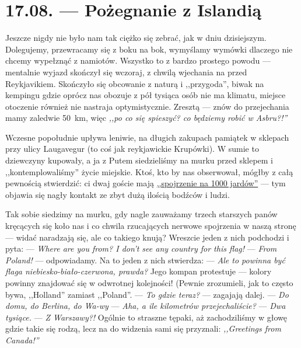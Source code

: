 \chapter*{17.08. --- Pożegnanie z Islandią}

Jeszcze nigdy nie było nam tak ciężko się zebrać, jak w dniu dzisiejszym. Dolegujemy, przewracamy się z boku na bok, wymyślamy wymów\-ki dlaczego nie chcemy wypełznąć z namiotów. Wszystko to z bardzo prostego powodu --- mentalnie wyjazd skończył się wczoraj, z chwilą wjechania na  przed Reykjavikiem. Skończyło się obcowanie z naturą i ,,przygoda'', biwak na kempingu gdzie oprócz nas obozuje z pół tysiąca osób nie ma klimatu, miejsce otoczenie również nie nastraja optymistycznie. Zresztą --- znów do przejechania mamy zaledwie 50~km, więc \emph{,,po co się spieszyć? co będziemy robić w Asbru?!''}

Wczesne popołudnie upływa leniwie, na długich zakupach pamiątek w sklepach przy ulicy Laugavegur (to coś jak reykjawickie Krupówki). W sumie to dziewczyny kupowały, a ja z Putem siedzieliśmy na murku przed sklepem i ,,kontemplowaliśmy'' życie miejskie. Ktoś, kto by nas obserwował, mógłby z całą pewnością stwierdzić: ci dwaj goście mają \href{http://en.wikipedia.org/wiki/Thousand-yard_stare}{,,spojrzenie na 1000 jardów''} --- tym objawia się nagły kontakt ze zbyt dużą ilością bodźców i ludzi.


Tak sobie siedzimy na murku, gdy nagle zauważamy trzech starszych panów kręcących się koło nas i co chwila rzucających nerwowe spojrzenia w naszą stronę --- widać naradzają się, ale co takiego knują? Wreszcie jeden z nich podchodzi i pyta: \newline
--- \emph{Where are you from? I don’t see any country for this flag!} \newline
--- \emph{From Poland!} --- odpowiadamy. \newline
Na to jeden z nich stwierdza: \newline
--- \emph{Ale to powinna być flaga niebiesko-biało-czerwona, prawda?} \newline
Jego kompan protestuje --- kolory powinny znajdować się w odwrotnej kolejności! (Pewnie zrozumieli, jak to często bywa, ,,Holland'' zamiast ,,Poland''. \newline
--- \emph{To gdzie teraz?} --- zagajają dalej. \newline
--- \emph{Do domu, do Berlina, do Wa-wy\textellipsis} \newline
--- \emph{Aha, a ile kilometrów przejechaliście?} \newline
--- \emph{Dwa tysiące.} \newline
--- \emph{Z Warszawy?!} \newline
Ogólnie to straszne tępaki, aż zachodziliśmy w głowę gdzie takie się rodzą, lecz na do widzenia sami się przyznali: \emph{,,Greetings from Canada!''}

